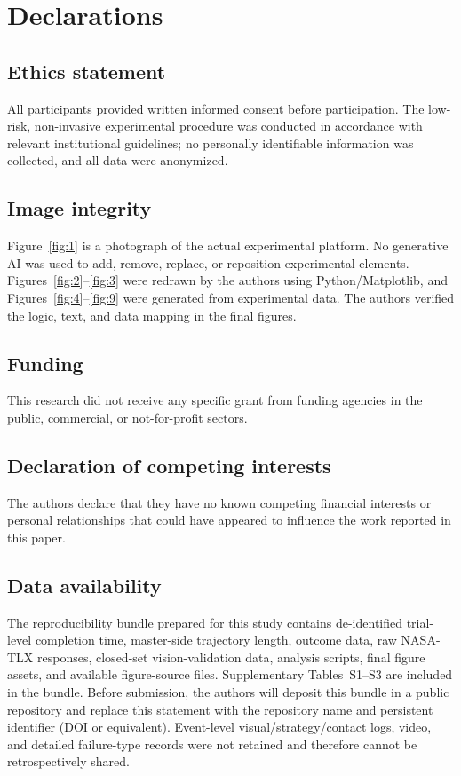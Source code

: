 \section*{Declarations}
\subsection*{Ethics statement}
All participants provided written informed consent before participation. The low-risk, non-invasive experimental procedure was conducted in accordance with relevant institutional guidelines; no personally identifiable information was collected, and all data were anonymized.

\subsection*{Image integrity}
Figure~\ref{fig:1} is a photograph of the actual experimental platform. No generative AI was used to add, remove, replace, or reposition experimental elements. Figures~\ref{fig:2}--\ref{fig:3} were redrawn by the authors using Python/Matplotlib, and Figures~\ref{fig:4}--\ref{fig:9} were generated from experimental data. The authors verified the logic, text, and data mapping in the final figures.

\subsection*{Funding}
This research did not receive any specific grant from funding agencies in the public, commercial, or not-for-profit sectors.

\subsection*{Declaration of competing interests}
The authors declare that they have no known competing financial interests or personal relationships that could have appeared to influence the work reported in this paper.

\subsection*{Data availability}
The reproducibility bundle prepared for this study contains de-identified trial-level completion time, master-side trajectory length, outcome data, raw NASA-TLX responses, closed-set vision-validation data, analysis scripts, final figure assets, and available figure-source files. Supplementary Tables~S1--S3 are included in the bundle. Before submission, the authors will deposit this bundle in a public repository and replace this statement with the repository name and persistent identifier (DOI or equivalent). Event-level visual/strategy/contact logs, video, and detailed failure-type records were not retained and therefore cannot be retrospectively shared.

